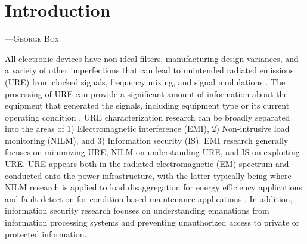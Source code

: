 \setcounter{page}{1}    %

\chapter{Introduction}

\bigskip
\setlength{\epigraphwidth}{.6\textwidth}
\begin{epigraphs}
	{---\textsc{George Box}}
	\centering
\end{epigraphs}
\bigskip

All electronic devices have non-ideal filters, manufacturing design variances, and a variety of other imperfections that can lead to unintended radiated emissions (URE) from clocked signals, frequency mixing, and signal modulations \cite{Stagner2014, Boroyevich2014, Meynard2011, Prvulovic2017}.  The processing of URE can provide a significant amount of information about the equipment that generated the signals, including equipment type \cite{Wang2012} or its current operating condition \cite{Vuagnoux2009}.  URE characterization research can be broadly separated into the areas of 1) Electromagnetic interference (EMI), 2) Non-intrusive load monitoring (NILM), and 3) Information security (IS). EMI research generally focuses on minimizing URE, NILM on understanding URE, and IS on exploiting URE.  URE appears both in the radiated electromagnetic (EM) spectrum and conducted onto the power infrastructure, with the latter typically being where NILM research is applied to load disaggregation for energy efficiency applications and fault detection for condition-based maintenance applications \cite{Harrold1979, Maughan2010, Timperley2017}.   In addition, information security research focuses on understanding emanations from information processing systems and preventing unauthorized access to private or protected information. 

